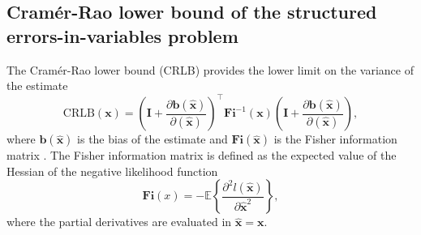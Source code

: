 \subsection{Cram\'er-Rao lower bound of the structured errors-in-variables problem}

The Cram\'er-Rao lower bound (CRLB) provides the lower limit on the variance of the estimate
\begin{equation} \mathrm{CRLB}(\mathbf{x}) = \left( \mathbf{I} + \frac{\partial \mathbf{b} (\widehat{\mathbf{x}}) }{\partial (\widehat{\mathbf{x}})} \right)^\top \mathbf{Fi}^{-1}(\mathbf{x}) \left( \mathbf{I} + \frac{\partial \mathbf{b} (\widehat{\mathbf{x}}) }{\partial (\widehat{\mathbf{x}})} \right), \label{eqn:CRLB} \end{equation}
where $\mathbf{b} (\widehat{\mathbf{x}})$ is the bias of the estimate and $\mathbf{Fi}(\widehat{\mathbf{x}})$ is the Fisher information matrix \cite{Pintelon12Book}.
The Fisher information matrix is defined as the expected value of the Hessian of the negative likelihood function 
\begin{equation} \mathbf{Fi}(x) = - \mathbb{E} \left\{ \frac{\partial ^2 l (\widehat{\mathbf{x}}) }{\partial \widehat{\mathbf{x}}^2 } \right\}, \end{equation}
where the partial derivatives are evaluated in $\widehat{\mathbf{x}} = \mathbf{x}$.

